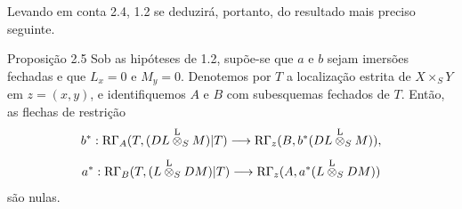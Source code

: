 Levando em conta 2.4, 1.2 se deduzirá, portanto, do resultado mais preciso seguinte.

\begin{statement}{Proposição 2.5}
Sob as hipóteses de 1.2, supõe-se que $a$ e $b$ sejam imersões fechadas e que $L_x=0$ e $M_y=0$. Denotemos por $T$ a localização estrita de $X\times_SY$ em $z=(x,y)$, e identifiquemos $A$ e $B$ com subesquemas fechados de $T$. Então, as flechas de restrição
\[
b^*:\mathrm{R}\Gamma_A(T,(DL\overset{\mathrm L}{\otimes}_SM)|T)
 \longrightarrow \mathrm{R}\Gamma_z(B,b^*(DL\overset{\mathrm L}{\otimes}_SM)),
\]
\[
a^*:\mathrm{R}\Gamma_B(T,(L\overset{\mathrm L}{\otimes}_SDM)|T)
 \longrightarrow \mathrm{R}\Gamma_z(A,a^*(L\overset{\mathrm L}{\otimes}_SDM))
\]
são nulas.
\end{statement}

